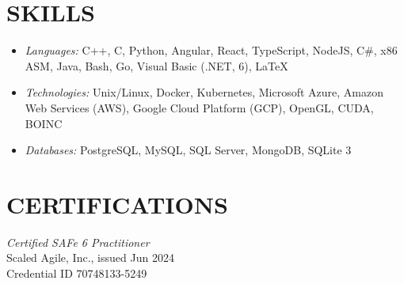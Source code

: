 \documentclass[margin]{res} %
\begin{document}
\begin{resume}


\pagebreak



\section{SKILLS}

\begin{itemize}[leftmargin=0cm, label={}]
    \item {\sl Languages:} 
    C++, C, Python, Angular, React, TypeScript, NodeJS, C\#, x86 ASM, Java, Bash, Go, Visual Basic (.NET, 6), \LaTeX
    \item {\sl Technologies:} 
    Unix/Linux, Docker, Kubernetes, Microsoft Azure, Amazon Web Services (AWS), Google Cloud Platform (GCP), OpenGL, CUDA, BOINC
    \item {\sl Databases:} 
    PostgreSQL, MySQL, SQL Server, MongoDB, SQLite 3
\end{itemize}

\section{CERTIFI\-CATIONS}

{\sl Certified SAFe\textsuperscript{\tiny\textregistered} 6 Practitioner}\\
Scaled Agile, Inc., issued Jun 2024\\
Credential ID 70748133-5249





\end{resume}
\end{document}
